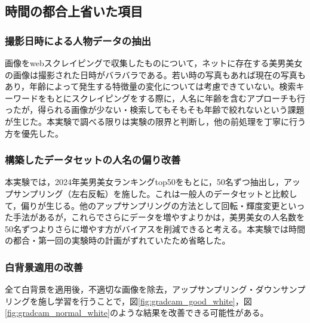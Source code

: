 \documentclass[a4paper,11pt,titlepage]{jsarticle}
\begin{document}
\subsection{時間の都合上省いた項目}
\subsubsection*{撮影日時による人物データの抽出}
画像をwebスクレイピングで収集したものについて，ネットに存在する美男美女の画像は撮影された日時がバラバラである。若い時の写真もあれば現在の写真もあり，年齢によって発生する特徴量の変化については考慮できていない。検索キーワードをもとにスクレイピングをする際に，人名に年齢を含むアプローチも行ったが，得られる画像が少ない・検索してもそもそも年齢で絞れないという課題が生じた。本実験で調べる限りは実験の限界と判断し，他の前処理を丁寧に行う方を優先した。

\subsubsection*{構築したデータセットの人名の偏り改善}
本実験では，2024年美男美女ランキングtop50をもとに，50名ずつ抽出し，アップサンプリング（左右反転）を施した。これは一般人のデータセットと比較して，偏りが生じる。他のアップサンプリングの方法として回転・輝度変更といった手法があるが，これらでさらにデータを増やすよりかは，美男美女の人名数を50名ずつよりさらに増やす方がバイアスを削減できると考える。本実験では時間の都合・第一回の実験時の計画がずれていたため省略した。

\subsubsection*{白背景適用の改善}
全て白背景を適用後，不適切な画像を除去，アップサンプリング・ダウンサンプリングを施し学習を行うことで，図\ref{fig:gradcam_good_white}，図\ref{fig:gradcam_normal_white}のような結果を改善できる可能性がある。
\end{document}

